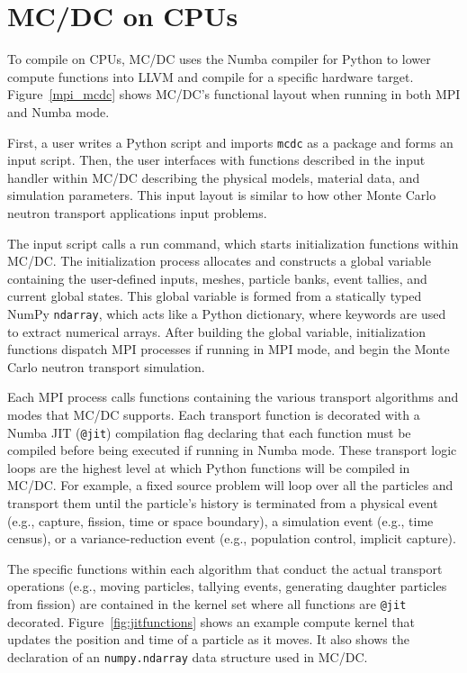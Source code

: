 \section{MC/DC on CPUs}

To compile on CPUs, MC/DC uses the Numba compiler for Python to lower compute functions into LLVM and compile for a specific hardware target.
Figure~\ref{mpi_mcdc} shows MC/DC's functional layout when running in both MPI and Numba mode.

First, a user writes a Python script and imports \texttt{mcdc} as a package and forms an input script.
Then, the user interfaces with functions described in the input handler within MC/DC describing the physical models, material data, and simulation parameters.
This input layout is similar to how other Monte Carlo neutron transport applications input problems.

The input script calls a run command, which starts initialization functions within MC/DC. 
The initialization process allocates and constructs a global variable containing the user-defined inputs, meshes, particle banks, event tallies, and current global states.
This global variable is formed from a statically typed NumPy \texttt{ndarray}, which acts like a Python dictionary, where keywords are used to extract numerical arrays.
After building the global variable, initialization functions dispatch MPI processes if running in MPI mode, and begin the Monte Carlo neutron transport simulation.


Each MPI process calls functions containing the various transport algorithms and modes that MC/DC supports.
Each transport function is decorated with a Numba JIT (\texttt{@jit}) compilation flag declaring that each function must be compiled before being executed if running in Numba mode.
These transport logic loops are the highest level at which Python functions will be compiled in MC/DC.
For example, a fixed source problem will loop over all the particles and transport them until the particle's history is terminated from a physical event (e.g., capture, fission, time or space boundary), a simulation event (e.g., time census), or a variance-reduction event (e.g., population control, implicit capture).

The specific functions within each algorithm that conduct the actual transport operations (e.g., moving particles, tallying events, generating daughter particles from fission) are contained in the kernel set where all functions are \texttt{@jit} decorated.
Figure~\ref{fig:jitfunctions} shows an example compute kernel that updates the position and time of a particle as it moves.
It also shows the declaration of an \texttt{numpy.ndarray} data structure used in MC/DC.

